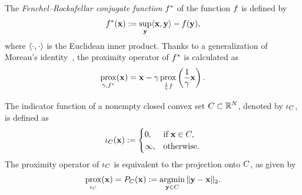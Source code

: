 \documentclass[10pt,journal]{IEEEtran}
\DeclareMathOperator{\prox}{prox}
\newcommand{\argmin}{\mathop{\mathrm{argmin}}\limits}
\begin{document}
The \textit{Fenchel--Rockafellar conjugate function} $f^{*}$ of the function $f$ is defined by
\begin{equation}
    \label{eq:ConjugateFunction}
    \FuncProx^{*}(\VarProxOne) := \sup_{\VarProxTwo} \InnerProduct<\VarProxOne, \VarProxTwo> - \FuncProx(\VarTwo),
\end{equation}
where $\InnerProduct<\cdot , \cdot>$ is the Euclidean inner product.
Thanks to a generalization of Moreau's identity~\cite{Combettes2013Moreau}, the proximity operator of $f^{*}$ is calculated as
\begin{equation}
    \label{eq:ProxConjugate}
    \prox_{\IndexProx, \FuncProx^{*}}(\VarProxOne) = \VarProxOne - \IndexProx \prox_{\frac{1}{\IndexProx} \FuncProx} \left( \frac{1}{\IndexProx} \VarProxOne \right).
\end{equation}


The indicator function of a nonempty closed convex set $C \subset \mathbb{R}^{N}$, denoted by $\iota_{C}$, is defined as 
\begin{equation}
    \label{eq:Indicator_Function}
    \iota_{C} (\mathbf{x}) := 
    \begin{cases}
        0, & \mathrm{if} \: \mathbf{x} \in C, \\
        \infty, & \mathrm{otherwise}.
    \end{cases}
\end{equation}
The proximity operator of $\iota_{C}$ is equivalent to the projection onto $C$, as given by
\begin{equation}
    \label{eq:Projection}
    \prox_{\FuncIndicator{\SetConvex}} (\VarProxOne) = \Projection{\SetConvex}(\VarProxOne) := \argmin_{\VarProxTwo \in \SetConvex} \|\VarProxTwo - \VarProxOne \|_{2}.
\end{equation}
\end{document}
